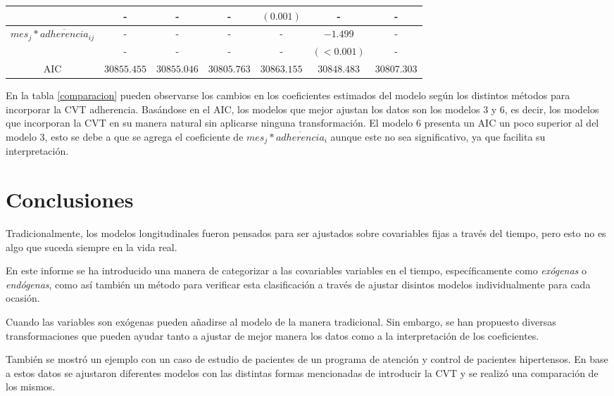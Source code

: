 \documentclass[spanish]{article}
\numberwithin{figure}{subsection}
\numberwithin{equation}{subsection}
\numberwithin{table}{subsection}
\begin{document}
\begin{table}[H]
\begin{tabular}{*{7}{|c}|}
														    & - 		  & - 			& - 		  & $(0.001)$	& - 		  & -		   \\
		\hline
		 & -			  & - 	   		& - 		  & -		    & $-1.499$    & -		   \\
															& -			  & -			& -			  & -			& $(<0.001)$  & -		   \\
		\hline
		\hline
		AIC													& $30855.455$ & $30855.046$ & $30805.763$ & $30863.155$ & $30848.483$ & $30807.303$ \\
		\hline
	\end{tabular}
\end{table}

En la tabla \ref{comparacion} pueden observarse los cambios en los coeficientes
estimados del modelo según los distintos métodos para incorporar la CVT
adherencia. Basándose en el AIC, los modelos que mejor ajustan los datos son los
modelos 3 y 6, es decir, los modelos que incorporan la CVT en su manera natural
sin aplicarse ninguna transformación. El modelo 6 presenta un AIC un poco
superior al del modelo 3, esto se debe a que se agrega el coeficiente de
$mes_j*\overline{adherencia}_i$ aunque este no sea significativo, ya que
facilita su interpretación.

\newpage

\section{Conclusiones}

Tradicionalmente, los modelos longitudinales fueron pensados para ser ajustados
sobre covariables fijas a través del tiempo, pero esto no es algo que suceda
siempre en la vida real.

En este informe se ha introducido una manera de categorizar a las covariables
variables en el tiempo, específicamente como \textit{exógenas} o
\textit{endógenas}, como así también un método para verificar esta clasificación
a través de ajustar disintos modelos individualmente para cada ocasión.

Cuando las variables son exógenas pueden añadirse al modelo de la manera
tradicional. Sin embargo, se han propuesto diversas transformaciones que pueden
ayudar tanto a ajustar de mejor manera los datos como a la interpretación de los
coeficientes.

También se mostró un ejemplo con un caso de estudio de pacientes de un programa
de atención y control de pacientes hipertensos. En base a estos datos se
ajustaron diferentes modelos con las distintas formas mencionadas de introducir
la CVT y se realizó una comparación de los mismos.
\end{document}
